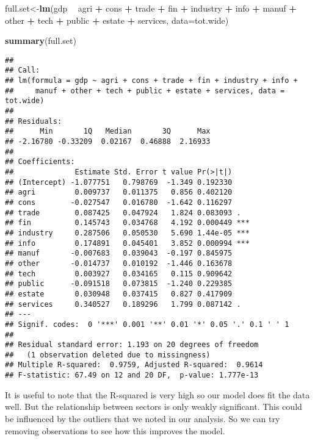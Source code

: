 \documentclass[
]{article}
\newenvironment{Shaded}{\begin{snugshade}}{\end{snugshade}}
\newcommand{\DataTypeTok}[1]{\textcolor[rgb]{0.13,0.29,0.53}{#1}}
\newcommand{\KeywordTok}[1]{\textcolor[rgb]{0.13,0.29,0.53}{\textbf{#1}}}
\newcommand{\NormalTok}[1]{#1}
\newcommand{\OperatorTok}[1]{\textcolor[rgb]{0.81,0.36,0.00}{\textbf{#1}}}
\newcommand{\StringTok}[1]{\textcolor[rgb]{0.31,0.60,0.02}{#1}}
\begin{document}
\begin{Shaded}
\begin{Highlighting}[]
\NormalTok{full.set<-}\KeywordTok{lm}\NormalTok{(gdp }\OperatorTok{~}\StringTok{ }\NormalTok{agri }\OperatorTok{+}\StringTok{ }\NormalTok{cons }\OperatorTok{+}\StringTok{ }\NormalTok{trade }\OperatorTok{+}\StringTok{ }\NormalTok{fin }\OperatorTok{+}\StringTok{ }\NormalTok{industry }\OperatorTok{+}\StringTok{ }\NormalTok{info }\OperatorTok{+}\StringTok{ }\NormalTok{manuf }\OperatorTok{+}\StringTok{ }\NormalTok{other }\OperatorTok{+}\StringTok{ }\NormalTok{tech }\OperatorTok{+}\StringTok{ }\NormalTok{public }\OperatorTok{+}\StringTok{ }\NormalTok{estate }\OperatorTok{+}\StringTok{ }\NormalTok{services, }\DataTypeTok{data=}\NormalTok{tot.wide)}

\KeywordTok{summary}\NormalTok{(full.set)}
\end{Highlighting}
\end{Shaded}

\begin{verbatim}
## 
## Call:
## lm(formula = gdp ~ agri + cons + trade + fin + industry + info + 
##     manuf + other + tech + public + estate + services, data = tot.wide)
## 
## Residuals:
##      Min       1Q   Median       3Q      Max 
## -2.16780 -0.33209  0.02167  0.46888  2.16933 
## 
## Coefficients:
##              Estimate Std. Error t value Pr(>|t|)    
## (Intercept) -1.077751   0.798769  -1.349 0.192330    
## agri         0.009737   0.011375   0.856 0.402120    
## cons        -0.027547   0.016780  -1.642 0.116297    
## trade        0.087425   0.047924   1.824 0.083093 .  
## fin          0.145743   0.034768   4.192 0.000449 ***
## industry     0.287506   0.050530   5.690 1.44e-05 ***
## info         0.174891   0.045401   3.852 0.000994 ***
## manuf       -0.007683   0.039043  -0.197 0.845975    
## other       -0.014737   0.010192  -1.446 0.163678    
## tech         0.003927   0.034165   0.115 0.909642    
## public      -0.091518   0.073815  -1.240 0.229385    
## estate       0.030948   0.037415   0.827 0.417909    
## services     0.340527   0.189296   1.799 0.087142 .  
## ---
## Signif. codes:  0 '***' 0.001 '**' 0.01 '*' 0.05 '.' 0.1 ' ' 1
## 
## Residual standard error: 1.193 on 20 degrees of freedom
##   (1 observation deleted due to missingness)
## Multiple R-squared:  0.9759, Adjusted R-squared:  0.9614 
## F-statistic: 67.49 on 12 and 20 DF,  p-value: 1.777e-13
\end{verbatim}

It is useful to note that the R-squared is very high so our model does
fit the data well. But the relationship between sectors is only weakly
significant. This could be influenced by the outliers that we noted in
our analysis. So we can try removing observations to see how this
improves the model.
\end{document}
